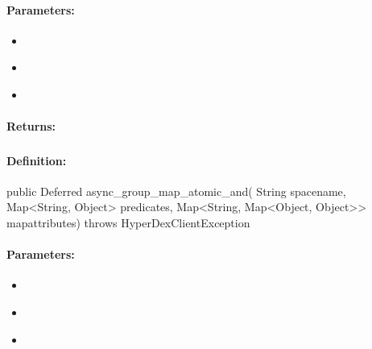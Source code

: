 \paragraph{Parameters:}
\begin{itemize}[noitemsep]
\item {}\\

\item {}\\

\item {}\\

\end{itemize}

\paragraph{Returns:}


\pagebreak
\subsubsection{}
\label{api:java:async_group_map_atomic_and}


\paragraph{Definition:}
\begin{javacode}
public Deferred async_group_map_atomic_and(
        String spacename,
        Map<String, Object> predicates,
        Map<String, Map<Object, Object>> mapattributes) throws HyperDexClientException
\end{javacode}

\paragraph{Parameters:}
\begin{itemize}[noitemsep]
\item {}\\

\item {}\\

\item {}\\

\end{itemize}

